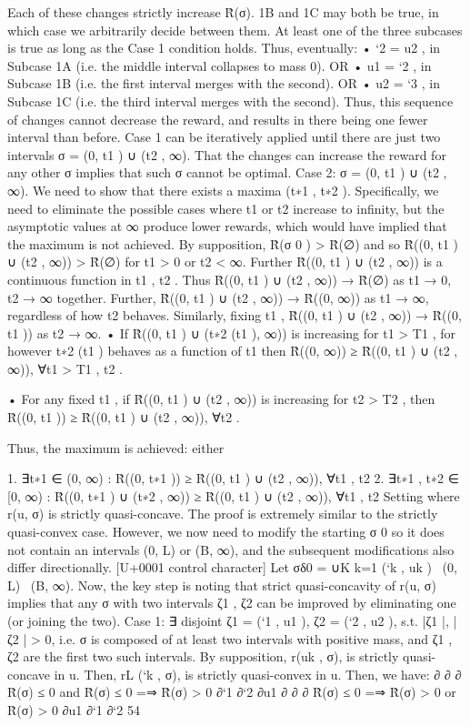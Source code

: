\documentclass[10pt]{article}
\begin{document}
\begin{ReviewVerbatim}
Each of these changes strictly increase R̂(σ). 1B and 1C may both be true, in which case we
arbitrarily decide between them. At least one of the three subcases is true as long as the Case 1
condition holds. Thus, eventually:
• `2 = u2 , in Subcase 1A (i.e. the middle interval collapses to mass 0). OR
• u1 = `2 , in Subcase 1B (i.e. the first interval merges with the second). OR
• u2 = `3 , in Subcase 1C (i.e. the third interval merges with the second).
Thus, this sequence of changes cannot decrease the reward, and results in there being one fewer
interval than before. Case 1 can be iteratively applied until there are just two intervals σ =
(0, t1 ) ∪ (t2 , ∞).
That the changes can increase the reward for any other σ implies that such σ cannot be optimal.
Case 2: σ = (0, t1 ) ∪ (t2 , ∞). We need to show that there exists a maxima (t∗1 , t∗2 ). Specifically, we
need to eliminate the possible cases where t1 or t2 increase to infinity, but the asymptotic values
at ∞ produce lower rewards, which would have implied that the maximum is not achieved.
By supposition, R̂(σ 0 ) > R̂(∅) and so R̂((0, t1 ) ∪ (t2 , ∞)) > R̂(∅) for t1 > 0 or t2 < ∞.
Further R̂((0, t1 ) ∪ (t2 , ∞)) is a continuous function in t1 , t2 . Thus R̂((0, t1 ) ∪ (t2 , ∞)) → R̂(∅)
as t1 → 0, t2 → ∞ together.
Further, R̂((0, t1 ) ∪ (t2 , ∞)) → R̂((0, ∞)) as t1 → ∞, regardless of how t2 behaves. Similarly,
fixing t1 , R̂((0, t1 ) ∪ (t2 , ∞)) → R̂((0, t1 )) as t2 → ∞.
• If R̂((0, t1 ) ∪ (t∗2 (t1 ), ∞)) is increasing for t1 > T1 , for however t∗2 (t1 ) behaves as a function of
t1 then R̂((0, ∞)) ≥ R̂((0, t1 ) ∪ (t2 , ∞)), ∀t1 > T1 , t2 .

• For any fixed t1 , if R̂((0, t1 ) ∪ (t2 , ∞)) is increasing for t2 > T2 , then R̂((0, t1 )) ≥ R̂((0, t1 ) ∪
(t2 , ∞)), ∀t2 .

Thus, the maximum is achieved: either

1. ∃t∗1 ∈ (0, ∞) : R̂((0, t∗1 )) ≥ R̂((0, t1 ) ∪ (t2 , ∞)), ∀t1 , t2
2. ∃t∗1 , t∗2 ∈ [0, ∞) : R̂((0, t∗1 ) ∪ (t∗2 , ∞)) ≥ R̂((0, t1 ) ∪ (t2 , ∞)), ∀t1 , t2
Setting where r(u, σ) is strictly quasi-concave.
The proof is extremely similar to the strictly quasi-convex case. However, we now need to
modify the starting σ 0 so it does not contain an intervals (0, L) or (B, ∞), and the subsequent
modifications also differ directionally.
[U+0001 control character]
Let σδ0 = ∪K
k=1 (`k , uk ) \ (0, L) \ (B, ∞). Now, the key step is noting that strict quasi-concavity
of r(u, σ) implies that any σ with two intervals ζ1 , ζ2 can be improved by eliminating one (or joining
the two).
Case 1: ∃ disjoint ζ1 = (`1 , u1 ), ζ2 = (`2 , u2 ), s.t. |ζ1 |, |ζ2 | > 0, i.e. σ is composed of at least
two intervals with positive mass, and ζ1 , ζ2 are the first two such intervals.
By supposition, r(uk , σ), is strictly quasi-concave in u. Then, rL (`k , σ), is strictly quasi-convex
in u.
Then, we have:
∂
∂
∂
R̂(σ) ≤ 0 and
R̂(σ) ≤ 0 =⇒
R̂(σ) > 0
∂`1
∂`2
∂u1
∂
∂
∂
R̂(σ) ≤ 0 =⇒
R̂(σ) > 0 or
R̂(σ) > 0
∂u1
∂`1
∂`2
54



\end{ReviewVerbatim}
\end{document}
